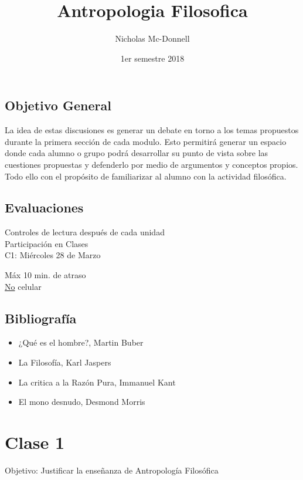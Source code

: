 \documentclass[11pt]{book}
\title{Antropologia Filosofica}
\author{Nicholas Mc-Donnell}
\date{1er semestre 2018}
\begin{document}
    \maketitle

    \section*{Objetivo General}
    La idea de estas discusiones es generar un debate en torno a los temas propuestos durante la primera sección de cada modulo. Esto permitirá generar un espacio donde cada alumno o grupo podrá desarrollar su punto de vista sobre las cuestiones propuestas y defenderlo por medio de argumentos y conceptos propios. Todo ello con el propósito de familiarizar al alumno con la actividad filosófica.

    \section*{Evaluaciones}
    { Controles de lectura después de cada unidad}\\
    Participación en Clases\\
    C1: Miércoles 28 de Marzo

    \begin{obs}
        Máx 10 min. de atraso\\
        \underline{No} celular
    \end{obs}

    \section*{Bibliografía}
    \begin{itemize}
        \item ¿Qué es el hombre?, Martin Buber

        \item La Filosofía, Karl Jaspers
        
        \item La critica a la Razón Pura, Immanuel Kant

        \item El mono desnudo, Desmond Morris
    \end{itemize}
    \newpage

    \tableofcontents

    \chapter{Clase 1}
    Objetivo: Justificar la enseñanza de Antropología Filosófica\\
\end{document}
